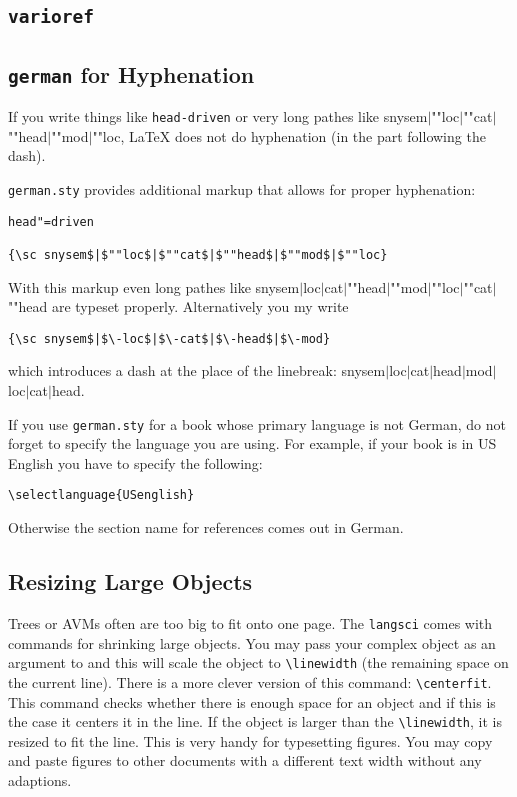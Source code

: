 \subsection{\texttt{varioref}}

\subsection{\texttt{german} for Hyphenation}

If you write things like \verb+head-driven+ or very long pathes like
{\sc snysem$|$""loc$|$""cat$|$""head$|$""mod$|$""loc}, \LaTeX{} does not do hyphenation
(in the part following the dash).

\verb+german.sty+ provides additional markup that allows for proper hyphenation:
\begin{verbatim}
head"=driven

{\sc snysem$|$""loc$|$""cat$|$""head$|$""mod$|$""loc}
\end{verbatim}
With this markup even long pathes like {\sc snysem$|$loc$|$cat$|$""head$|$""mod$|$""loc$|$""cat$|$""head}
are typeset properly. Alternatively you my write
\begin{verbatim}
{\sc snysem$|$\-loc$|$\-cat$|$\-head$|$\-mod}
\end{verbatim}
which introduces a dash at the place of the linebreak:
{\sc snysem$|$\-loc$|$\-cat$|$\-head$|$\-mod$|$\-loc$|$\-cat$|$\-head}.

If you use \verb+german.sty+ for a book whose primary language is not German, do not forget to
specify the language you are using. For example, if your book is in US English you have to specify
the following:
\begin{verbatim}
\selectlanguage{USenglish}
\end{verbatim}
Otherwise the section name for references comes out in German.

\subsection{Resizing Large Objects}

Trees or AVMs often are too big to fit onto one page. The \texttt{langsci} comes with commands for
shrinking large objects. You may pass your complex object as an argument to \texttt{\oneline} and
this will scale the object to \verb+\linewidth+ (the remaining space on the current line). There is
a more clever version of this command: \verb+\centerfit+. This command checks whether there is
enough space for an object and if this is the case it centers it in the line. If the object is
larger than the \verb+\linewidth+, it is resized to fit the line. This is very handy for typesetting
figures. You may copy and paste figures to other documents with a different text width without any
adaptions.


